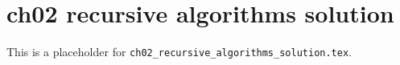 \chapter{ch02 recursive algorithms solution}
\label{ch02_recursive_algorithms_solution}

This is a placeholder for \texttt{ch02_recursive_algorithms_solution.tex}.


